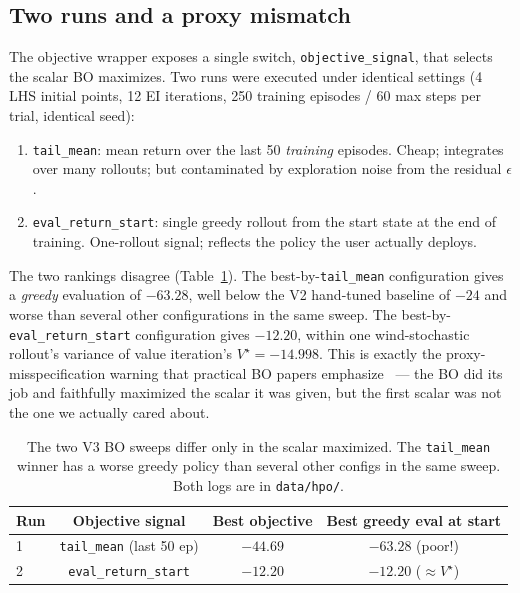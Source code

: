 \documentclass[11pt,letterpaper]{article}
\begin{document}
\subsection{Two runs and a proxy mismatch}
The objective wrapper exposes a single switch, \texttt{objective\_signal}, that selects the scalar BO maximizes. Two runs were executed under identical settings (4 LHS initial points, 12 EI iterations, 250 training episodes / 60 max steps per trial, identical seed):

\begin{enumerate}\setlength\itemsep{1pt}
  \item \texttt{tail\_mean}: mean return over the last 50 \emph{training} episodes. Cheap; integrates over many rollouts; but contaminated by exploration noise from the residual $\epsilon$.
  \item \texttt{eval\_return\_start}: single greedy rollout from the start state at the end of training. One-rollout signal; reflects the policy the user actually deploys.
\end{enumerate}

The two rankings disagree (Table~\ref{tab:v3-bo}). The best-by-\texttt{tail\_mean} configuration gives a \emph{greedy} evaluation of $-63.28$, well below the V2 hand-tuned baseline of $-24$ and worse than several other configurations in the same sweep. The best-by-\texttt{eval\_return\_start} configuration gives $-12.20$, within one wind-stochastic rollout's variance of value iteration's $V^{\star} = -14.998$. This is exactly the proxy-misspecification warning that practical BO papers emphasize~\cite{snoek2012} --- the BO did its job and faithfully maximized the scalar it was given, but the first scalar was not the one we actually cared about.

\begin{table}[h]
\centering\small
\begin{tabular}{lccc}
\toprule
Run & Objective signal & Best objective & Best greedy eval at start \\
\midrule
1 & \texttt{tail\_mean} (last 50 ep) & $-44.69$ & $-63.28$ (poor!) \\
2 & \texttt{eval\_return\_start}     & $-12.20$ & $-12.20$ ($\approx V^{\star}$) \\
\bottomrule
\end{tabular}
\caption{The two V3 BO sweeps differ only in the scalar maximized. The \texttt{tail\_mean} winner has a worse greedy policy than several other configs in the same sweep. Both logs are in \texttt{data/hpo/}.}
\label{tab:v3-bo}
\end{table}
\end{document}
